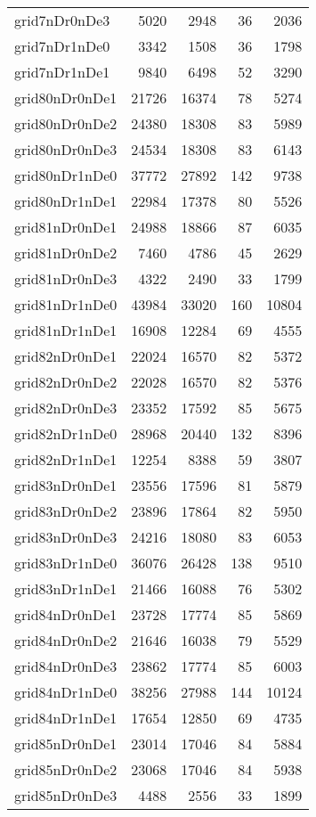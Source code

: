\begin{tabular}{lrrrr}
grid7nDr0nDe3 & 5020 & 2948 & 36 & 2036 \\
grid7nDr1nDe0 & 3342 & 1508 & 36 & 1798 \\
grid7nDr1nDe1 & 9840 & 6498 & 52 & 3290 \\
grid80nDr0nDe1 & 21726 & 16374 & 78 & 5274 \\
grid80nDr0nDe2 & 24380 & 18308 & 83 & 5989 \\
grid80nDr0nDe3 & 24534 & 18308 & 83 & 6143 \\
grid80nDr1nDe0 & 37772 & 27892 & 142 & 9738 \\
grid80nDr1nDe1 & 22984 & 17378 & 80 & 5526 \\
grid81nDr0nDe1 & 24988 & 18866 & 87 & 6035 \\
grid81nDr0nDe2 & 7460 & 4786 & 45 & 2629 \\
grid81nDr0nDe3 & 4322 & 2490 & 33 & 1799 \\
grid81nDr1nDe0 & 43984 & 33020 & 160 & 10804 \\
grid81nDr1nDe1 & 16908 & 12284 & 69 & 4555 \\
grid82nDr0nDe1 & 22024 & 16570 & 82 & 5372 \\
grid82nDr0nDe2 & 22028 & 16570 & 82 & 5376 \\
grid82nDr0nDe3 & 23352 & 17592 & 85 & 5675 \\
grid82nDr1nDe0 & 28968 & 20440 & 132 & 8396 \\
grid82nDr1nDe1 & 12254 & 8388 & 59 & 3807 \\
grid83nDr0nDe1 & 23556 & 17596 & 81 & 5879 \\
grid83nDr0nDe2 & 23896 & 17864 & 82 & 5950 \\
grid83nDr0nDe3 & 24216 & 18080 & 83 & 6053 \\
grid83nDr1nDe0 & 36076 & 26428 & 138 & 9510 \\
grid83nDr1nDe1 & 21466 & 16088 & 76 & 5302 \\
grid84nDr0nDe1 & 23728 & 17774 & 85 & 5869 \\
grid84nDr0nDe2 & 21646 & 16038 & 79 & 5529 \\
grid84nDr0nDe3 & 23862 & 17774 & 85 & 6003 \\
grid84nDr1nDe0 & 38256 & 27988 & 144 & 10124 \\
grid84nDr1nDe1 & 17654 & 12850 & 69 & 4735 \\
grid85nDr0nDe1 & 23014 & 17046 & 84 & 5884 \\
grid85nDr0nDe2 & 23068 & 17046 & 84 & 5938 \\
grid85nDr0nDe3 & 4488 & 2556 & 33 & 1899 \\

\end{tabular}
